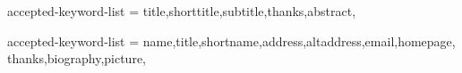 


 {
   accepted-keyword-list = 
      {title,shorttitle,subtitle,thanks,abstract},
 }


 {
   accepted-keyword-list = 
      {name,title,shortname,address,altaddress,email,homepage,%
       thanks,biography,picture},
 }


\endinput

